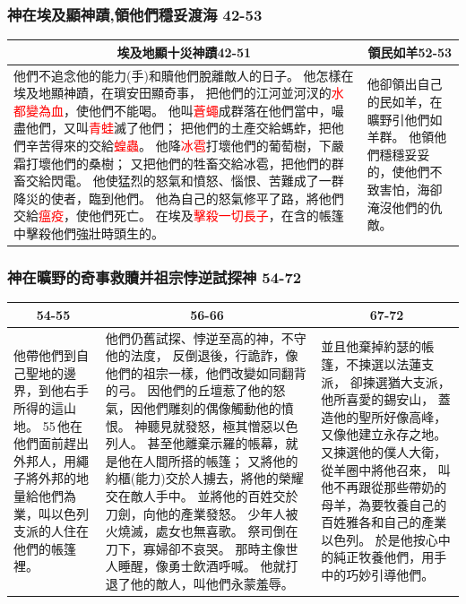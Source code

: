 \subsubsection{神在埃及顯神蹟,領他們穩妥渡海 42-53}
\begin{table}[H]
\hspace{-6mm}
\centering
\begin{tabular}{p{14.5cm}|p{}}\hline\hline
\multicolumn{1}{c|}{埃及地顯十災神蹟42-51}&\multicolumn{1}{c}{領民如羊52-53}\\\hline\hline
他們不追念他的能力(手)和贖他們脫離敵人的日子。
他怎樣在埃及地顯神蹟，在瑣安田顯奇事，
把他們的江河並河汊的\textcolor{red}{水都變為血}，使他們不能喝。
他叫\textcolor{red}{蒼蠅}成群落在他們當中，嘬盡他們，又叫\textcolor{red}{青蛙}滅了他們；
把他們的土產交給螞蚱，把他們辛苦得來的交給\textcolor{red}{蝗蟲}。
他降\textcolor{red}{冰雹}打壞他們的葡萄樹，下嚴霜打壞他們的桑樹；
又把他們的牲畜交給冰雹，把他們的群畜交給閃電。
他使猛烈的怒氣和憤怒、惱恨、苦難成了一群降災的使者，臨到他們。
他為自己的怒氣修平了路，將他們交給\textcolor{red}{瘟疫}，使他們死亡。
在埃及\textcolor{red}{擊殺一切長子}，在含的帳篷中擊殺他們強壯時頭生的。
&他卻領出自己的民如羊，在曠野引他們如羊群。
他領他們穩穩妥妥的，使他們不致害怕，海卻淹沒他們的仇敵。\\\hline
\end{tabular}
\end{table}


\subsubsection{神在曠野的奇事救贖并祖宗悖逆試探神 54-72}
\begin{table}[H]
\hspace{-6mm}
\centering
\begin{tabular}{p{}|p{9.25cm}|p{5cm}}\hline\hline
\multicolumn{1}{c|}{54-55}&\multicolumn{1}{c|}{56-66}&\multicolumn{1}{c}{67-72}\\\hline\hline
他帶他們到自己聖地的邊界，到他右手所得的這山地。
55 他在他們面前趕出外邦人，用繩子將外邦的地量給他們為業，叫以色列支派的人住在他們的帳篷裡。
&他們仍舊試探、悖逆至高的神，不守他的法度，
反倒退後，行詭詐，像他們的祖宗一樣，他們改變如同翻背的弓。
因他們的丘壇惹了他的怒氣，因他們雕刻的偶像觸動他的憤恨。
神聽見就發怒，極其憎惡以色列人。
甚至他離棄示羅的帳幕，就是他在人間所搭的帳篷；
又將他的約櫃(能力)交於人擄去，將他的榮耀交在敵人手中。
並將他的百姓交於刀劍，向他的產業發怒。
少年人被火燒滅，處女也無喜歌。
祭司倒在刀下，寡婦卻不哀哭。
那時主像世人睡醒，像勇士飲酒呼喊。
他就打退了他的敵人，叫他們永蒙羞辱。
&並且他棄掉約瑟的帳篷，不揀選以法蓮支派，
卻揀選猶大支派，他所喜愛的錫安山，
蓋造他的聖所好像高峰，又像他建立永存之地。
又揀選他的僕人大衛，從羊圈中將他召來，
叫他不再跟從那些帶奶的母羊，為要牧養自己的百姓雅各和自己的產業以色列。
於是他按心中的純正牧養他們，用手中的巧妙引導他們。\\\hline
\end{tabular}
\end{table}


